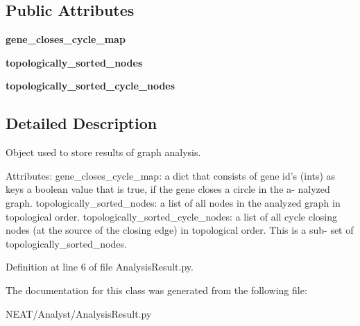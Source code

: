 \subsection*{Public Attributes}
\begin{DoxyCompactItemize}
\item 
{\bfseries gene\+\_\+closes\+\_\+cycle\+\_\+map}\hypertarget{class_n_e_a_t___py_genetics_1_1_n_e_a_t_1_1_analyst_1_1_analysis_result_1_1_analysis_result_a8ad8be788715b6298240055bbd835d5e}{}\label{class_n_e_a_t___py_genetics_1_1_n_e_a_t_1_1_analyst_1_1_analysis_result_1_1_analysis_result_a8ad8be788715b6298240055bbd835d5e}

\item 
{\bfseries topologically\+\_\+sorted\+\_\+nodes}\hypertarget{class_n_e_a_t___py_genetics_1_1_n_e_a_t_1_1_analyst_1_1_analysis_result_1_1_analysis_result_a5dec17c624dfc418d21b543b366413e2}{}\label{class_n_e_a_t___py_genetics_1_1_n_e_a_t_1_1_analyst_1_1_analysis_result_1_1_analysis_result_a5dec17c624dfc418d21b543b366413e2}

\item 
{\bfseries topologically\+\_\+sorted\+\_\+cycle\+\_\+nodes}\hypertarget{class_n_e_a_t___py_genetics_1_1_n_e_a_t_1_1_analyst_1_1_analysis_result_1_1_analysis_result_acca98f28e97dddad4c4ee0c86d499e58}{}\label{class_n_e_a_t___py_genetics_1_1_n_e_a_t_1_1_analyst_1_1_analysis_result_1_1_analysis_result_acca98f28e97dddad4c4ee0c86d499e58}

\end{DoxyCompactItemize}


\subsection{Detailed Description}
\begin{DoxyVerb}Object used to store results of graph analysis.

Attributes:
    gene_closes_cycle_map: a dict that consists of gene id's (ints) as keys
        a boolean value that is true, if the gene closes a circle in the a-
        nalyzed graph.
    topologically_sorted_nodes: a list of all nodes in the analyzed graph in
        topological order.
    topologically_sorted_cycle_nodes: a list of all cycle closing nodes (at
        the source of the closing edge) in topological order. This is a sub-
        set of topologically_sorted_nodes.
\end{DoxyVerb}
 

Definition at line 6 of file Analysis\+Result.\+py.



The documentation for this class was generated from the following file\+:\begin{DoxyCompactItemize}
\item 
N\+E\+A\+T/\+Analyst/Analysis\+Result.\+py\end{DoxyCompactItemize}
